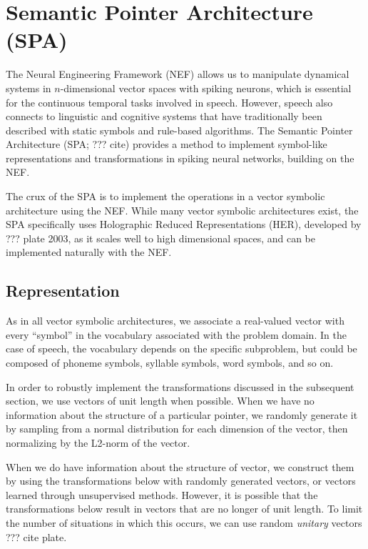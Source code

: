 {\section{Semantic Pointer Architecture (SPA)}

The Neural Engineering Framework (NEF)
allows us to manipulate dynamical systems
in $n$-dimensional vector spaces
with spiking neurons,
which is essential for
the continuous temporal tasks
involved in speech.
However, speech also connects
to linguistic and cognitive systems
that have traditionally been described
with static symbols
and rule-based algorithms.
The Semantic Pointer Architecture (SPA; ??? cite)
provides a method to implement
symbol-like representations
and transformations in spiking neural networks,
building on the NEF.

The crux of the SPA is to implement
the operations in
a vector symbolic architecture
using the NEF.
While many vector symbolic architectures exist,
the SPA specifically uses
Holographic Reduced Representations (HER),
developed by ??? plate 2003,
as it scales well to high dimensional spaces,
and can be implemented naturally
with the NEF.

\subsection{Representation}

As in all vector symbolic architectures,
we associate a real-valued vector
with every ``symbol''
in the vocabulary associated with
the problem domain.
In the case of speech,
the vocabulary depends on
the specific subproblem,
but could be composed
of phoneme symbols,
syllable symbols,
word symbols, and so on.

In order to robustly implement
the transformations discussed
in the subsequent section,
we use vectors of unit length
when possible.
When we have no information
about the structure of a particular pointer,
we randomly generate it
by sampling from a normal distribution
for each dimension of the vector,
then normalizing by the L2-norm
of the vector.


When we do have information about
the structure of vector,
we construct them by
using the transformations below
with randomly generated vectors,
or vectors learned through
unsupervised methods.
However, it is possible that
the transformations below
result in vectors that are
no longer of unit length.
To limit the number of situations
in which this occurs,
we can use random \textit{unitary} vectors
??? cite plate.

}
